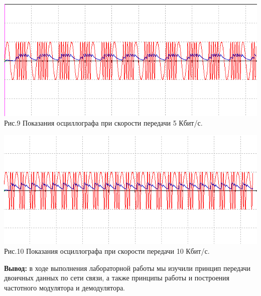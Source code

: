 \documentclass[11pt]{article}
\begin{document}
\begin{center}
    \includegraphics[width=1\linewidth]{img/osc32.png}
        Рис.9 Показания осциллографа при скорости передачи 5 Кбит/с.
\end{center}
\begin{center}
    \includegraphics[width=1\linewidth]{img/osc33.png}
        Рис.10 Показания осциллографа при скорости передачи 10 Кбит/с.
\end{center}

\textbf{Вывод:} в ходе выполнения лабораторной работы мы изучили принцип передачи двоичных данных по сети связи, а также принципы работы и построения частотного модулятора и демодулятора.
\end{document}

